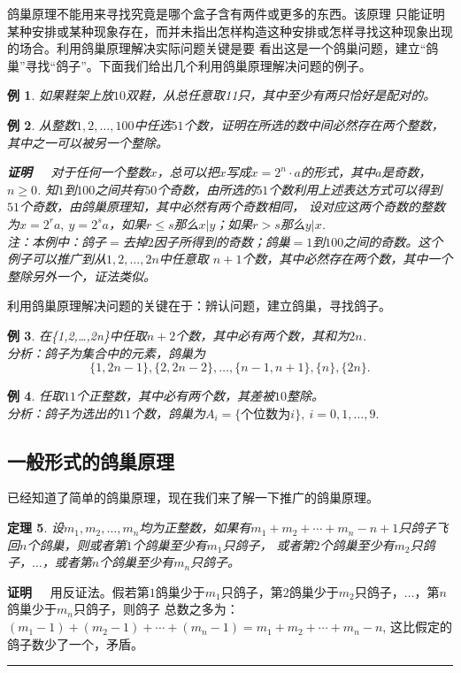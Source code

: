 \documentclass[a4paper,11pt,twoside]{book}
\newtheorem{thm}{定理}[section]
\newtheorem{exa}[thm]{例}
\def\qed{\nopagebreak\hfill{\rule{4pt}{7pt}}\medbreak}
\def\pf{{\bf 证明~~ }}
\begin{document}
鸽巢原理不能用来寻找究竟是哪个盒子含有两件或更多的东西。该原理
只能证明某种安排或某种现象存在，而并未指出怎样构造这种安排或怎样寻找这种现象出现的场合。利用鸽巢原理解决实际问题关键是要
看出这是一个鸽巢问题，建立“鸽巢”寻找“鸽子”。下面我们给出几个利用鸽巢原理解决问题的例子。
\begin{exa}
如果鞋架上放$10$双鞋，从总任意取11只，其中至少有两只恰好是配对的。
\end{exa}
\begin{exa}
从整数$1,2,\ldots,100$中任选$51$个数，证明在所选的数中间必然存在两个整数，其中之一可以被另一个整除。

\pf 对于任何一个整数$x$，总可以把$x$写成$x=2^n\cdot
a$的形式，其中$a$是奇数，$n\geq 0$.
知$1$到$100$之间共有$50$个奇数，由所选的$51$个数利用上述表达方式可以得到$51$个奇数，由鸽巢原理知，其中必然有两个奇数相同，
设对应这两个奇数的整数为$x=2^ra,\ y=2^sa$，如果$r\leq s$那么$x|y$；如果$r>s$那么$y|x$.\\
注：本例中：鸽子$=$去掉$2$因子所得到的奇数；鸽巢$=$$1$到$100$之间的奇数。这个例子可以推广到从$1,2,\ldots,2n$中任意取
$n+1$个数，其中必然存在两个数，其中一个整除另外一个，证法类似。
\end{exa}

利用鸽巢原理解决问题的关键在于：辨认问题，建立鸽巢，寻找鸽子。
\begin{exa}
在\{1,2,\ldots,2n\}中任取$n+2$个数，其中必有两个数，其和为$2n$.
\\分析：鸽子为集合中的元素，鸽巢为$$\{1,2n-1\},\{2,2n-2\},\ldots,\{n-1,n+1\},\{n\},\{2n\}.$$
\end{exa}

\begin{exa}
任取$11$个正整数，其中必有两个数，其差被$10$整除。
\\分析：鸽子为选出的$11$个数，鸽巢为$A_i=\{\mbox{个位数为}i\},\ i=0,1,\ldots,9.$
\end{exa}

\subsection{一般形式的鸽巢原理}

已经知道了简单的鸽巢原理，现在我们来了解一下推广的鸽巢原理。
\begin{thm}
设$m_1,m_2,\ldots,m_n$均为正整数，如果有$m_1+m_2+\cdots+m_n-n+1$只鸽子飞回$n$个鸽巢，则或者第$1$个鸽巢至少有$m_1$只鸽子，
或者第$2$个鸽巢至少有$m_2$只鸽子，$\ldots$，或者第$n$个鸽巢至少有$m_n$只鸽子。
\end{thm}
\pf
用反证法。假若第$1$鸽巢少于$m_1$只鸽子，第$2$鸽巢少于$m_2$只鸽子，$\ldots$，第$n$鸽巢少于$m_n$只鸽子，则鸽子
总数之多为：$(m_1-1)+(m_2-1)+\cdots+(m_n-1)=m_1+m_2+\cdots+m_n-n$,
这比假定的鸽子数少了一个，矛盾。\qed
\end{document}

